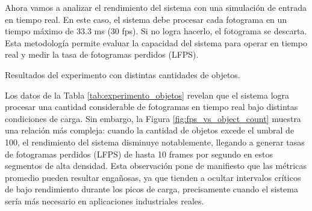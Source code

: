 \documentclass[11pt,spanish,listoffigures,listoftables]{tfgetsinf}
\begin{document}
Ahora vamos a analizar el rendimiento del sistema con una simulación de entrada en tiempo real. En este caso, el sistema debe procesar cada fotograma en un tiempo máximo de 33.3 ms (30 fps). Si no logra hacerlo, el fotograma se descarta. Esta metodología permite evaluar la capacidad del sistema para operar en tiempo real y medir la tasa de fotogramas perdidos (LFPS).

\begin{table}[H]
   \centering
   \caption[Resultados del experimento con distintas cantidades de objetos]{Resultados del experimento con distintas cantidades de objetos.}
   \label{tab:experimento_objetos}
\end{table}

Los datos de la Tabla \ref{tab:experimento_objetos} revelan que el sistema logra procesar una cantidad considerable de fotogramas en tiempo real bajo distintas condiciones de carga. Sin embargo, la Figura \ref{fig:fps_vs_object_count} muestra una relación más compleja: cuando la cantidad de objetos excede el umbral de 100, el rendimiento del sistema disminuye notablemente, llegando a generar tasas de fotogramas perdidos (LFPS) de hasta 10 frames por segundo en estos segmentos de alta densidad. Esta observación pone de manifiesto que las métricas promedio pueden resultar engañosas, ya que tienden a ocultar intervalos críticos de bajo rendimiento durante los picos de carga, precisamente cuando el sistema sería más necesario en aplicaciones industriales reales.
\end{document}
